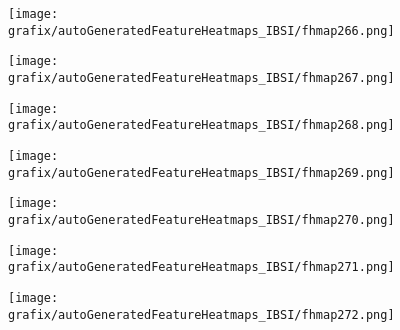 \begin{subfigure}{\wid\textwidth} 
    \centering 
    \caption{\tiny \sffamily {}} 
    \vspace{\vsp} 
    \texttt{[image: grafix/autoGeneratedFeatureHeatmaps\_IBSI/fhmap266.png]} 
\end{subfigure} 
\hspace{\hsp} 
\begin{subfigure}{\wid\textwidth} 
    \centering 
    \caption{\tiny \sffamily {}} 
    \vspace{\vsp} 
    \texttt{[image: grafix/autoGeneratedFeatureHeatmaps\_IBSI/fhmap267.png]} 
\end{subfigure} 
\hspace{\hsp} 
\begin{subfigure}{\wid\textwidth} 
    \centering 
    \caption{\tiny \sffamily {}} 
    \vspace{\vsp} 
    \texttt{[image: grafix/autoGeneratedFeatureHeatmaps\_IBSI/fhmap268.png]} 
\end{subfigure} 
\hspace{\hsp} 
\begin{subfigure}{\wid\textwidth} 
    \centering 
    \caption{\tiny \sffamily {}} 
    \vspace{\vsp} 
    \texttt{[image: grafix/autoGeneratedFeatureHeatmaps\_IBSI/fhmap269.png]} 
\end{subfigure} 
\hspace{\hsp} 
\begin{subfigure}{\wid\textwidth} 
    \centering 
    \caption{\tiny \sffamily {}} 
    \vspace{\vsp} 
    \texttt{[image: grafix/autoGeneratedFeatureHeatmaps\_IBSI/fhmap270.png]} 
\end{subfigure} 
\hspace{\hsp} 
\begin{subfigure}{\wid\textwidth} 
    \centering 
    \caption{\tiny \sffamily {}} 
    \vspace{\vsp} 
    \texttt{[image: grafix/autoGeneratedFeatureHeatmaps\_IBSI/fhmap271.png]} 
\end{subfigure} 
\hspace{\hsp} 
\begin{subfigure}{\wid\textwidth} 
    \centering 
    \caption{\tiny \sffamily {}} 
    \vspace{\vsp} 
    \texttt{[image: grafix/autoGeneratedFeatureHeatmaps\_IBSI/fhmap272.png]} 
\end{subfigure} 
